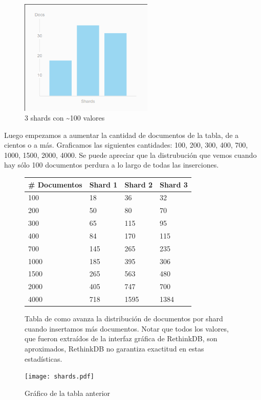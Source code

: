 \begin{figure}[H]
 \centering
 \includegraphics[width=2.5in]{sharding/img/3shard100.png}
 \caption{3 shards con \textasciitilde 100 valores}
 \label{fig:3shard100}
\end{figure}

Luego empezamos a aumentar la cantidad de documentos de la tabla, de a cientos o a más. Graficamos las siguientes cantidades: 100, 200, 300, 400, 700, 1000, 1500, 2000, 4000. Se puede apreciar que la distrubución que vemos cuando hay sólo 100 documentos perdura a lo largo de todas las inserciones.

\begin{figure}[H]
\centering
\begin{tabular}{|l | l | l | l|}
  \hline
  \# Documentos & Shard 1 & Shard 2 & Shard 3 \\
  \hline
  100           & 18  & 36  & 32 \\
  200           & 50  & 80  & 70 \\
  300           & 65  & 115 & 95 \\
  400           & 84  & 170 & 115 \\
  700           & 145 & 265 & 235 \\
  1000          & 185 & 395 & 306 \\
  1500          & 265 & 563 & 480 \\
  2000          & 405 & 747 & 700 \\
  4000          & 718 & 1595 & 1384 \\
  \hline
\end{tabular}
 \caption{Tabla de como avanza la distribución de documentos por shard cuando insertamos más documentos. Notar que todos los valores, que fueron extraídos de la interfaz gráfica de RethinkDB, son aproximados, RethinkDB no garantiza exactitud en estas estadísticas.}
 \label{fig:shardstabla}
\end{figure}


\begin{figure}[H]
 \centering
 \texttt{[image: shards.pdf]}
 \caption{Gráfico de la tabla anterior}
 \label{fig:shardslinea}
\end{figure}


